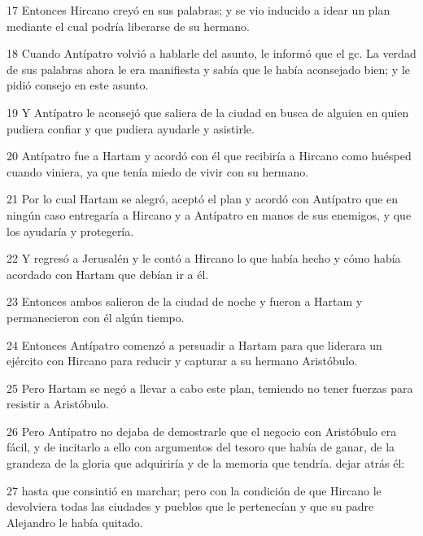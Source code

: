 \par 17 Entonces Hircano creyó en sus palabras; y se vio inducido a idear un plan mediante el cual podría liberarse de su hermano.

\par 18 Cuando Antípatro volvió a hablarle del asunto, le informó que el gc. La verdad de sus palabras ahora le era manifiesta y sabía que le había aconsejado bien; y le pidió consejo en este asunto.

\par 19 Y Antípatro le aconsejó que saliera de la ciudad en busca de alguien en quien pudiera confiar y que pudiera ayudarle y asistirle.

\par 20 Antípatro fue a Hartam y acordó con él que recibiría a Hircano como huésped cuando viniera, ya que tenía miedo de vivir con su hermano.

\par 21 Por lo cual Hartam se alegró, aceptó el plan y acordó con Antípatro que en ningún caso entregaría a Hircano y a Antípatro en manos de sus enemigos, y que los ayudaría y protegería.

\par 22 Y regresó a Jerusalén y le contó a Hircano lo que había hecho y cómo había acordado con Hartam que debían ir a él.

\par 23 Entonces ambos salieron de la ciudad de noche y fueron a Hartam y permanecieron con él algún tiempo.

\par 24 Entonces Antípatro comenzó a persuadir a Hartam para que liderara un ejército con Hircano para reducir y capturar a su hermano Aristóbulo.

\par 25 Pero Hartam se negó a llevar a cabo este plan, temiendo no tener fuerzas para resistir a Aristóbulo.

\par 26 Pero Antípatro no dejaba de demostrarle que el negocio con Aristóbulo era fácil, y de incitarlo a ello con argumentos del tesoro que había de ganar, de la grandeza de la gloria que adquiriría y de la memoria que tendría. dejar atrás él:

\par 27 hasta que consintió en marchar; pero con la condición de que Hircano le devolviera todas las ciudades y pueblos que le pertenecían y que su padre Alejandro le había quitado.

